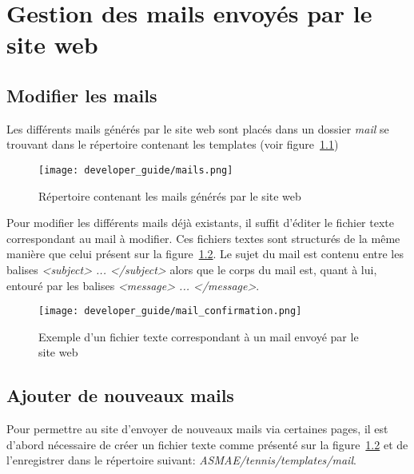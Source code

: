 \chapter{Gestion des mails envoyés par le site web}

\section{Modifier les mails}

Les différents mails générés par le site web sont placés dans un dossier \textit{mail} se trouvant dans le répertoire contenant les templates (voir figure~\ref{fig:Répertoire contenant les mails générés par le site web})

\begin{figure}[!ht]
    \centering
    \texttt{[image: developer\_guide/mails.png]}
    \caption{Répertoire contenant les mails générés par le site web}
    \label{fig:Répertoire contenant les mails générés par le site web}
\end{figure}
\FloatBarrier

Pour modifier les différents mails déjà existants, il suffit d'éditer le fichier texte correspondant au mail à modifier. Ces fichiers textes sont structurés de la même manière que celui présent sur la figure~\ref{fig:Exemple d'un fichier texte correspondant à un mail envoyé par le site web}. Le sujet du mail est contenu entre les balises \textit{<subject> ... </subject>} alors que le corps du mail est, quant à lui, entouré par les balises \textit{<message> ... </message>}.

\begin{figure}[!ht]
    \centering
    \texttt{[image: developer\_guide/mail\_confirmation.png]}
    \caption{Exemple d'un fichier texte correspondant à un mail envoyé par le site web}
    \label{fig:Exemple d'un fichier texte correspondant à un mail envoyé par le site web}
\end{figure}
\FloatBarrier

\section{Ajouter de nouveaux mails}

Pour permettre au site d'envoyer de nouveaux mails via certaines pages, il est d'abord nécessaire de créer un fichier texte comme présenté sur la figure~\ref{fig:Exemple d'un fichier texte correspondant à un mail envoyé par le site web} et de l'enregistrer dans le répertoire suivant: \textit{ASMAE/tennis/templates/mail}.

